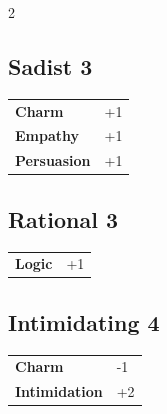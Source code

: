 \begin{multicols}{2}
\begin{tcolorbox}

\end{tcolorbox}

\begin{tcolorbox}
    \subsection*{Sadist \hfill \small{3 }}
    \tcblower




\begin{tabular}{@{}ll@{}}
    \textbf{Charm} & +1\\
    \textbf{Empathy} & +1\\
    \textbf{Persuasion} & +1\\
\end{tabular}


\end{tcolorbox}

\begin{tcolorbox}
    \subsection*{Rational \hfill \small{3 }}
    \tcblower




\begin{tabular}{@{}ll@{}}
    \textbf{Logic} & +1\\
\end{tabular}


\end{tcolorbox}

\begin{tcolorbox}
    \subsection*{Intimidating \hfill \small{4 }}
    \tcblower




\begin{tabular}{@{}ll@{}}
    \textbf{Charm} & -1\\
    \textbf{Intimidation} & +2\\
\end{tabular}


\end{tcolorbox}
\end{multicols}
